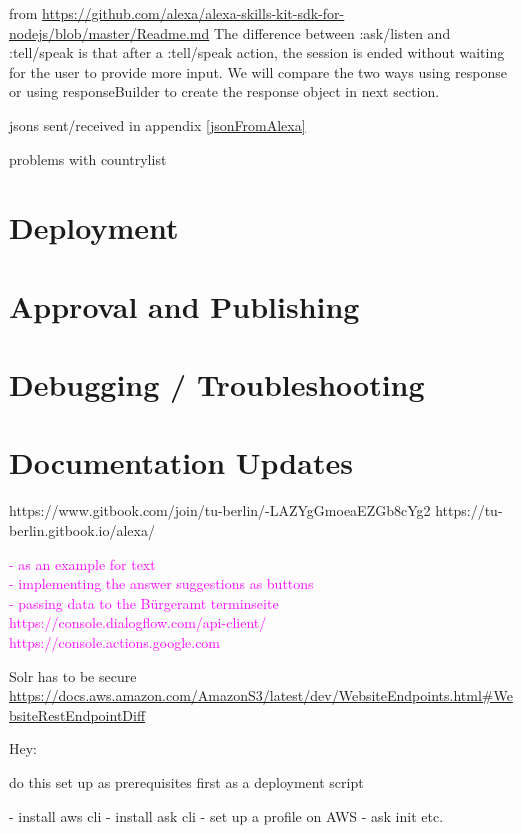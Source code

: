 from \url{https://github.com/alexa/alexa-skills-kit-sdk-for-nodejs/blob/master/Readme.md}
The difference between :ask/listen and :tell/speak is that after a :tell/speak action, the session is ended without waiting for the user to provide more input. We will compare the two ways using response or using responseBuilder to create the response object in next section.




jsons sent/received in appendix
\ref{jsonFromAlexa}




problems with countrylist

\section{Deployment}

\section{Approval and Publishing}

\section{Debugging / Troubleshooting}

\section{Documentation Updates}
https://www.gitbook.com/join/tu-berlin/-LAZYgGmoeaEZGb8cYg2
https://tu-berlin.gitbook.io/alexa/

\textcolor{magenta}{
- as an example for text\\
- implementing the answer suggestions as buttons\\
- passing data to the Bürgeramt terminseite\\
https://console.dialogflow.com/api-client/ \\
https://console.actions.google.com
}


Solr has to be secure
\url{https://docs.aws.amazon.com/AmazonS3/latest/dev/WebsiteEndpoints.html#WebsiteRestEndpointDiff}


Hey:

do this set up as prerequisites first
as a deployment script

- install aws cli
- install ask cli
- set up a profile on AWS
- ask init etc.

